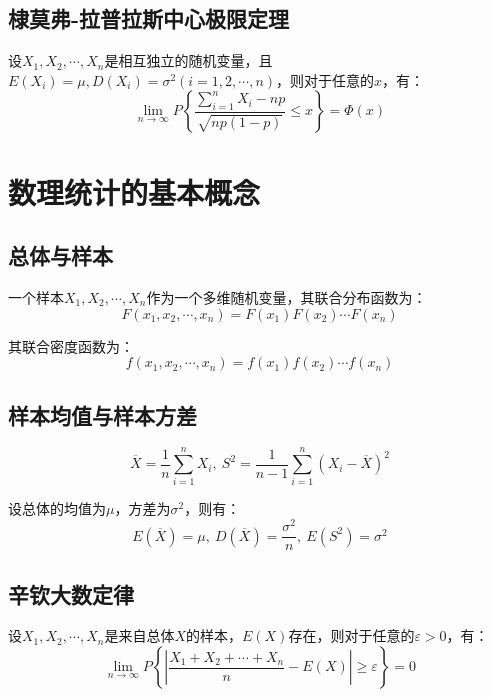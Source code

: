 \documentclass[a4paper,12pt]{ctexart}
\begin{document}
\subsection{棣莫弗-拉普拉斯中心极限定理}

设$X_1,X_2,\cdots,X_n$是相互独立的随机变量，且$E(X_i) = \mu, D(X_i) = \sigma^2(i = 1,2,\cdots,n)$，则对于任意的$x$，有：
\begin{equation*}
	\lim_{n \rightarrow \infty} P\left\{\frac{\sum_{i=1}^nX_i - np}{\sqrt{np(1-p)}} \leq x \right\} = \Phi(x)
\end{equation*}

\section{数理统计的基本概念}

\subsection{总体与样本}

一个样本$X_1,X_2,\cdots,X_n$作为一个多维随机变量，其联合分布函数为：
\begin{equation*}
	F(x_1,x_2,\cdots,x_n) = F(x_1)F(x_2)\cdots F(x_n)
\end{equation*}

其联合密度函数为：
\begin{equation*}
	f(x_1,x_2,\cdots,x_n) = f(x_1)f(x_2)\cdots f(x_n)
\end{equation*}

\subsection{样本均值与样本方差}

\begin{equation*}
	\overline{X} = \frac{1}{n}\sum_{i=1}^nX_i,\ S^2 = \frac{1}{n-1}\sum_{i=1}^n(X_i - \overline{X})^2
\end{equation*}

设总体的均值为$\mu$，方差为$\sigma^2$，则有：
\begin{equation*}
	E(\overline{X}) = \mu,\ D(\overline{X}) = \frac{\sigma^2}{n},\ E(S^2) = \sigma^2
\end{equation*}

\subsection{辛钦大数定律}

设$X_1,X_2,\cdots,X_n$是来自总体$X$的样本，$E(X)$存在，则对于任意的$\varepsilon > 0$，有：
\begin{equation*}
	\lim_{n\rightarrow\infty}P\left\{\left|\frac{X_1 + X_2 + \cdots + X_n}{n} - E(X)\right| \geq \varepsilon\right\} = 0
\end{equation*}
\end{document}
